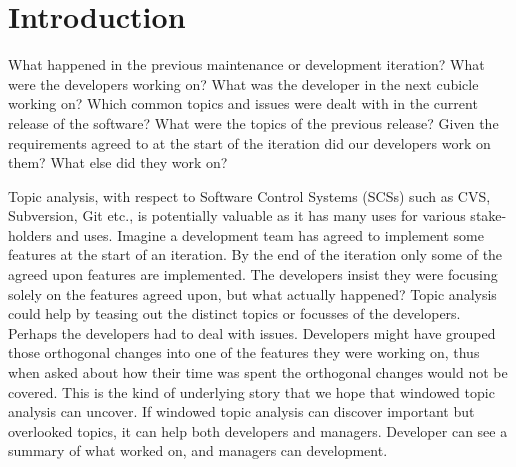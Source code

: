 \documentclass[times, 10pt,twocolumn]{article}
\newcommand{\lda}{Latent Dirichlet Allocation}
\begin{document}
\begin{abstract}

\end{abstract}

\section{Introduction}



% 





What happened in the previous maintenance or development iteration? What were the developers
working on? What was the developer in the next cubicle working on?
Which common topics and issues were dealt with in the current
release of the software? What were the topics of the previous release?
Given the requirements agreed to at the start of the iteration did our
developers work on them? What else did they work on?

Topic analysis, with respect to Software Control Systems (SCSs) such
as CVS, Subversion, Git etc., is potentially valuable as it has many
uses for various stake-holders and uses.  Imagine a development team
has agreed to implement some features at the start of an iteration. By
the end of the iteration only some of the agreed upon features are
implemented. The developers insist they were focusing solely on the
features agreed upon, but what actually happened? Topic analysis could
help by teasing out the distinct topics or focusses of the
developers. Perhaps the developers had to deal with issues.
Developers might have grouped those orthogonal changes into one of the
features they were working on, thus when asked about how their time
was spent the orthogonal changes would not be covered. This is the kind of underlying story that we
hope that windowed topic analysis can uncover. If windowed topic
analysis can discover important but overlooked topics, it can help
both developers and managers. Developer can see a summary of what
worked on, and managers can development.
\end{document}

